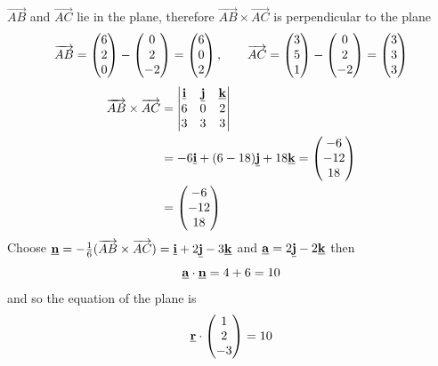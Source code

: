 \begin{solution}
$\overrightarrow{AB}$ and $\overrightarrow{AC}$ lie in the plane, therefore $\overrightarrow{AB}\times\overrightarrow{AC}$ is perpendicular to the plane
\[
\overrightarrow{AB}=\begin{pmatrix}6\\2\\0\end{pmatrix}-\begin{pmatrix}0\\2\\-2\end{pmatrix}=\begin{pmatrix}6\\0\\2\end{pmatrix},
\qquad
\overrightarrow{AC}=\begin{pmatrix}3\\5\\1\end{pmatrix}-\begin{pmatrix}0\\2\\-2\end{pmatrix}=\begin{pmatrix}3\\3\\3\end{pmatrix}
\]
\begin{align*}
\overrightarrow{AB}\times\overrightarrow{AC}
&=\begin{vmatrix}\underline{\mathbf{i}}&\underline{\mathbf{j}}&\underline{\mathbf{k}}\\6&0&2\\3&3&3\end{vmatrix}\\
&=-6\underline{\mathbf{i}}+(6-18)\underline{\mathbf{j}}+18\underline{\mathbf{k}}=\begin{pmatrix}-6\\-12\\18\end{pmatrix}\\
&=\begin{pmatrix}-6\\-12\\18\end{pmatrix}
\end{align*}
Choose $\underline{\mathbf{n}}=-\frac{1}{6}(\overrightarrow{AB}\times\overrightarrow{AC})=\underline{\mathbf{i}}+2\underline{\mathbf{j}}-3\underline{\mathbf{k}}$
and $\underline{\mathbf{a}}=2\underline{\mathbf{j}}-2\underline{\mathbf{k}}$ then
\[
\underline{\mathbf{a}}\cdot\underline{\mathbf{n}}= 4+6=10
\]
and so the equation of the plane is
\[
\underline{\mathbf{r}}\cdot\begin{pmatrix}1\\2\\-3\end{pmatrix}=10
\]
\end{solution}

